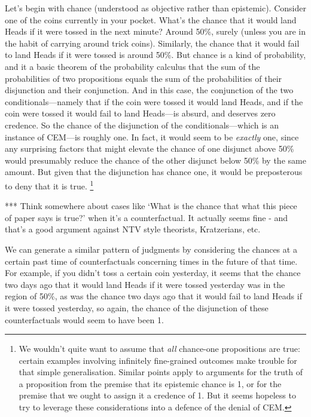 \documentclass[leqno, 11pt, a5paper, openany]{article}
\begin{document}
Let's begin with chance (understood as objective rather than epistemic). Consider one of the coins currently in your pocket. What's the chance that it would land Heads if it were tossed in the next minute? Around 50\%, surely (unless you are in the habit of carrying around trick coins). Similarly, the chance that it would fail to land Heads if it were tossed is around 50\%. But chance is a kind of probability, and it a basic theorem of the probability calculus that the sum of the probabilities of two propositions equals the sum of the probabilities of their disjunction and their conjunction. And in this case, the conjunction of the two conditionals---namely that if the coin were tossed it would land Heads, and if the coin were tossed it would fail to land Heads---is absurd, and deserves zero credence. So the chance of the disjunction of the conditionals---which is an instance of CEM---is roughly one. In fact, it would seem to be \emph{exactly} one, since any surprising factors that might elevate the chance of one disjunct above 50\% would presumably reduce the chance of the other disjunct below 50\% by the same amount. But given that the disjunction has chance one, it would be preposterous to deny that it is true.%
\footnote{We wouldn't quite want to assume that \emph{all} chance-one propositions are true: certain examples involving infinitely fine-grained outcomes make trouble for that simple generalisation. Similar points apply to arguments for the truth of a proposition from the premise that its epistemic chance is 1, or for the premise that we ought to assign it a credence of 1. But it seems hopeless to try to leverage these considerations into a defence of the denial of CEM.}

*** Think somewhere about cases like ‘What is the chance that what this piece of paper says is true?’ when it's a counterfactual.  It actually seems fine - and that's a good argument against NTV style theorists, Kratzerians, etc.  

We can generate a similar pattern of judgments by considering the chances at a certain past time of counterfactuals concerning times in the future of that time. For example, if you didn't toss a certain coin yesterday, it seems that the chance two days ago that it would land Heads if it were tossed yesterday was in the region of 50\%, as was the chance two days ago that it would fail to land Heads if it were tossed yesterday, so again, the chance of the disjunction of these counterfactuals would seem to have been 1.
\end{document}
